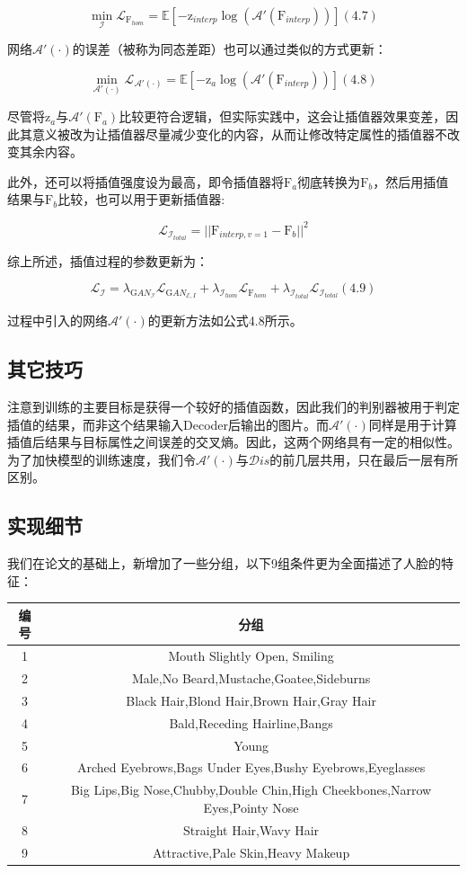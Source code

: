 \documentclass[UTF8,a4paper，12pt]{article}
\def\MC {\mathcal}
\theoremstyle{theorem}
\theoremstyle{definition}
\begin{document}
$$\min_ {\MC I} \MC L_{\mathrm F_{hom}} = \mathbb E [-\mathrm z_{interp}\log(\MC A'(\mathrm F_{interp}))]    (4.7)$$

网络$\MC A'(\cdot)$的误差（被称为同态差距）也可以通过类似的方式更新：

$$\min_ {\MC A'(\cdot)} \MC L_{\MC A'(\cdot)} = \mathbb E [-\mathrm z_a\log(\MC A'(\mathrm F_{interp}))]    (4.8)$$

尽管将$\mathrm z_a$与$\MC A'(\mathrm F_a)$比较更符合逻辑，但实际实践中，这会让插值器效果变差，因此其意义被改为让插值器尽量减少变化的内容，从而让修改特定属性的插值器不改变其余内容。

此外，还可以将插值强度设为最高，即令插值器将$\mathrm F_a$彻底转换为$\mathrm F_b$，然后用插值结果与$\mathrm F_b$比较，也可以用于更新插值器:

$$\MC L_{\MC I_{total}} = ||\mathrm F_{interp,v=1} - \mathrm F_b||^2$$

综上所述，插值过程的参数更新为：

$$\MC L_{\MC I} = \lambda_{\mathrm GAN_{\MC I}}\MC L_{\mathrm GAN_{\MC E,I}} + \lambda_{\MC I_{hom}}\MC L_{\mathrm F_{hom}} + \lambda_{\MC I_{total}}\MC L_{\MC I_{total}}    (4.9)$$

过程中引入的网络$\MC A'(\cdot)$的更新方法如公式4.8所示。

\subsection{其它技巧}

注意到训练的主要目标是获得一个较好的插值函数，因此我们的判别器被用于判定插值的结果，而非这个结果输入Decoder后输出的图片。而$\MC A'(\cdot)$同样是用于计算插值后结果与目标属性之间误差的交叉熵。因此，这两个网络具有一定的相似性。为了加快模型的训练速度，我们令$\MC A'(\cdot)$与$\MC Dis$的前几层共用，只在最后一层有所区别。

\subsection{实现细节}

我们在论文的基础上，新增加了一些分组，以下9组条件更为全面描述了人脸的特征：

\begin{tabular}{c|c}
  编号 & 分组 \\
  \hline
  1 & Mouth Slightly Open, Smiling \\
  2 & Male,No Beard,Mustache,Goatee,Sideburns \\
 3 & Black Hair,Blond Hair,Brown Hair,Gray Hair\\
 4 & Bald,Receding Hairline,Bangs\\
 5 & Young\\
 6 & Arched Eyebrows,Bags Under Eyes,Bushy Eyebrows,Eyeglasses\\
 7 & Big Lips,Big Nose,Chubby,Double Chin,High Cheekbones,Narrow Eyes,Pointy Nose\\
 8 & Straight Hair,Wavy Hair\\
 9 & Attractive,Pale Skin,Heavy Makeup
\end{tabular}
\end{document}
